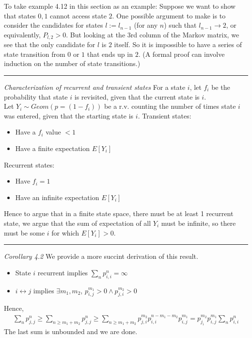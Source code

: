\documentclass[a4paper]{article}
\newcommand{\divider}[0]{\begin{center}
\rule{15cm}{1pt}
\end{center}}
\begin{document}
To take example 4.12 in this section as an example: Suppose we want to show that states $0,1$ cannot access state $2$. One possible argument to make is to consider the candidates for states $l:=l_{n-1}$ (for any $n$) such that $l_{n-1}\rightarrow 2$, or equivalently, $P_{l,2} > 0$. But looking at the 3rd column of the Markov matrix, we see that the only candidate for $l$ is $2$ itself. So it is impossible to have a series of state transition from $0$ or $1$ that ends up in $2$. (A formal proof can involve induction on the number of state transitions.)

\divider

\emph{Characterization of recurrent and transient states}
For a state $i$, let $f_i$ be the probability that state $i$ is revisited, given that the current state is $i$.\\
Let $Y_i\sim Geom(p=(1-f_i))$ be a r.v. counting the number of times state $i$ was entered, given that the starting state is $i$.
Transient states:
\begin{itemize}
    \item Have a $f_i$ value $<1$
    \item Have a finite expectation $E[Y_i]$ 
\end{itemize}
Recurrent states:
\begin{itemize}
    \item Have $f_i = 1$
    \item Have an infinite expectation $E[Y_i]$
\end{itemize}
Hence to argue that in a finite state space, there must be at least 1 recurrent state, we argue that the sum of expectation of all $Y_i$ must be infinite, so there must be some $i$ for which $E[Y_i] > 0$.

\divider

\emph{Corollary 4.2} We provide a more succint derivation of this result.
\begin{itemize}
    \item State $i$ recurrent implies $\sum_n p_{i,i}^n=\infty$
    \item $i\leftrightarrow j$ implies $\exists m_1,m_2$, $p_{i,j}^{m_1} > 0\land p_{j,i}^{m_2} > 0$
\end{itemize}
Hence,
\begin{align*}
    \sum_n p_{j,j}^n\geq \sum_{n\geq m_1 + m_2}p_{j,j}^n \geq \sum_{n\geq m_1 + m_2}p_{j,i}^{m_2}p_{i,i}^{n-m_1-m_2}p_{i,j}^{m_1} = p_{j_i}^{m_2}p_{i,j}^{m_1}\sum_n p_{i,i}^n
\end{align*}
The last sum is unbounded and we are done.
\end{document}
